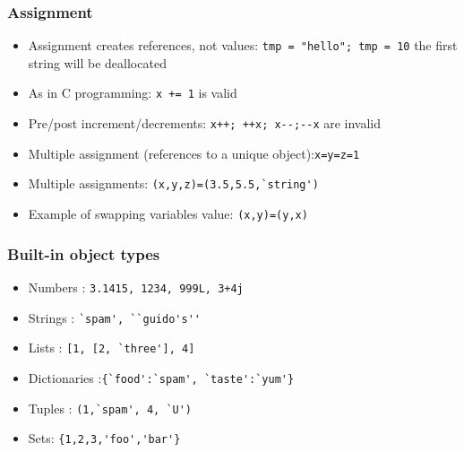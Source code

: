 \begin{frame}[fragile]  \frametitle{Assignment}
\begin{itemize}
\item Assignment creates references, not values:
\lstinline{tmp = "hello"; tmp = 10}
the first string will be deallocated
\item As in C programming: \lstinline{x += 1} is valid
\item Pre/post increment/decrements: \lstinline{x++; ++x; x--;--x} are invalid
\item Multiple assignment (references to a unique object):\lstinline{x=y=z=1}
\item Multiple assignments: \lstinline{(x,y,z)=(3.5,5.5,`string')}
\item  Example of swapping variables value: \lstinline{(x,y)=(y,x)}
\end{itemize}
\end{frame}


\begin{frame}[fragile]\frametitle{Built-in object types}
  \begin{itemize}
  \item Numbers : \lstinline{3.1415, 1234, 999L, 3+4j}
  \item Strings : \lstinline{`spam', ``guido's''}
  \item Lists : \lstinline{[1, [2, `three'], 4]}
   \item Dictionaries :\lstinline|{`food':`spam', `taste':`yum'}|
  \item Tuples : \lstinline{(1,`spam', 4, `U')}
  \item Sets: \lstinline|{1,2,3,'foo','bar'}|
  \end{itemize}
\end{frame}

